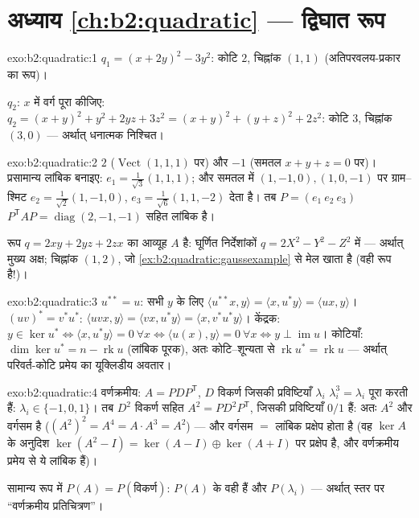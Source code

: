 \section*{अध्याय \ref{ch:b2:quadratic} --- द्विघात रूप}

\begin{solution}{exo:b2:quadratic:1}
$q_1 = (x + 2y)^2 - 3y^2$: कोटि $2$, चिह्नांक $(1, 1)$ (अतिपरवलय-प्रकार का रूप)।

$q_2$: $x$ में वर्ग पूरा कीजिए: $q_2 = (x + y)^2 + y^2 + 2yz +
3z^2 = (x+y)^2 + (y + z)^2 + 2z^2$: कोटि $3$, चिह्नांक $(3, 0)$ --- अर्थात्
धनात्मक निश्चित।
\end{solution}

\begin{solution}{exo:b2:quadratic:2}
 $2$ ($\operatorname{Vect}(1,1,1)$ पर) और $-1$ (समतल $x + y + z = 0$ पर)। प्रसामान्य लांबिक
बनाइए: $e_1 =
\frac{1}{\sqrt3}(1,1,1)$; और समतल में $(1,-1,0),
(1,0,-1)$ पर ग्राम--श्मिट $e_2 = \frac{1}{\sqrt2}(1,-1,0)$, $e_3 =
\frac{1}{\sqrt6}(1,1,-2)$ देता है। तब $P = (e_1\ e_2\ e_3)$
$P^{\mathsf T}AP = \operatorname{diag}(2,-1,-1)$ सहित लांबिक है।

रूप $q = 2xy + 2yz + 2zx$ का आव्यूह $A$ है: घूर्णित निर्देशांकों $q = 2X^2 - Y^2 - Z^2$ में --- अर्थात् मुख्य
अक्ष; चिह्नांक $(1,2)$, जो \cref{ex:b2:quadratic:gaussexample} से मेल खाता है (वही रूप है!)।
\end{solution}

\begin{solution}{exo:b2:quadratic:3}
$u^{**} = u$: सभी $y$ के लिए $\langle u^{**}x, y\rangle = \langle x, u^*y\rangle =
\langle ux, y\rangle$। $(uv)^* = v^*u^*$: $\langle
uvx, y\rangle = \langle vx, u^*y\rangle = \langle x,
v^*u^*y\rangle$। केंद्रक: $y \in \ker u^* \iff \langle x, u^*y
\rangle = 0\ \forall x \iff \langle u(x), y\rangle = 0\ \forall x
\iff y \perp \operatorname{im} u$। कोटियाँ: $\dim\ker u^* = n -
\operatorname{rk} u$ (लांबिक
पूरक), अतः कोटि--शून्यता से $\operatorname{rk} u^* = \operatorname{rk} u$ --- अर्थात् परिवर्त-कोटि प्रमेय का
यूक्लिडीय अवतार।
\end{solution}

\begin{solution}{exo:b2:quadratic:4}
वर्णक्रमीय: $A = PDP^{\mathsf T}$, $D$ विकर्ण जिसकी प्रविष्टियाँ $\lambda_i$ $\lambda_i^3 = \lambda_i$ पूरा करती हैं:
$\lambda_i \in
\{-1, 0, 1\}$। तब $D^2$ विकर्ण सहित $A^2 = PD^2P^{\mathsf T}$, जिसकी प्रविष्टियाँ $0/1$ हैं: अतः $A^2$  और
वर्गसम है ($(A^2)^2 = A^4 = A\cdot A^3 = A^2$) --- और  वर्गसम $=$ लांबिक प्रक्षेप होता है (वह $\ker A$
के अनुदिश $\ker(A^2 - I) = \ker(A-I)\oplus\ker(A+I)$ पर प्रक्षेप है, और वर्णक्रमीय प्रमेय से ये लांबिक हैं)।

सामान्य रूप में $P(A) = P\!\left(\text{विकर्ण}\right)$: $P(A)$ के  वही हैं
और  $P(\lambda_i)$ --- अर्थात्  स्तर पर ``वर्णक्रमीय
प्रतिचित्रण''।
\end{solution}


